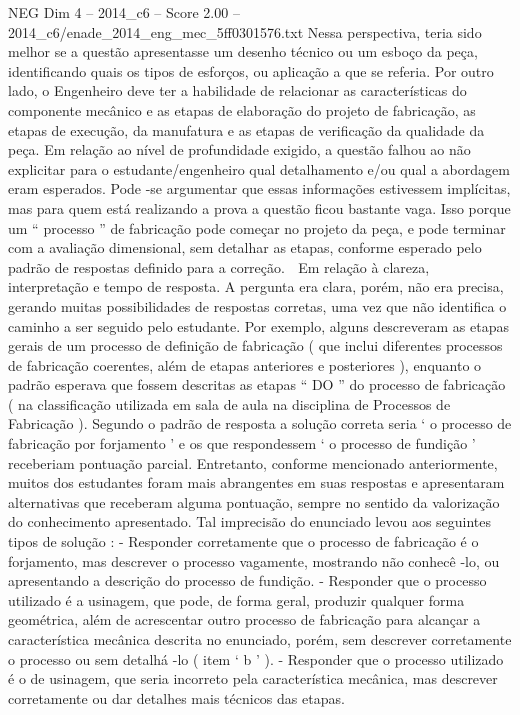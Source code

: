 \begin{textsample}{NEG Dim 4 – 2014\_c6 – Score 2.00 – 2014\_c6/enade\_2014\_eng\_mec\_5ff0301576.txt}
Nessa perspectiva, teria sido melhor se a questão apresentasse um desenho técnico ou um esboço da peça, identificando quais os tipos de esforços, ou aplicação a que se referia.
Por outro lado, o Engenheiro deve ter a habilidade de relacionar as características do componente mecânico e as etapas de elaboração do projeto de fabricação, as etapas de execução, da manufatura e as etapas de verificação da qualidade da peça.
Em relação ao nível de profundidade exigido, a questão falhou ao não explicitar para o estudante/engenheiro qual detalhamento e/ou qual a abordagem eram esperados.
Pode -se argumentar que essas informações estivessem implícitas, mas para quem está realizando a prova a questão ficou bastante vaga.
Isso porque um “ processo ” de fabricação pode começar no projeto da peça, e pode terminar com a avaliação dimensional, sem detalhar as etapas, conforme esperado pelo padrão de respostas definido para a correção.  Em relação à clareza, interpretação e tempo de resposta.
A pergunta era clara, porém, não era precisa, gerando muitas possibilidades de respostas corretas, uma vez que não identifica o caminho a ser seguido pelo estudante.
Por exemplo, alguns descreveram as etapas gerais de um processo de definição de fabricação ( que inclui diferentes processos de fabricação coerentes, além de etapas anteriores e posteriores ), enquanto o padrão esperava que fossem descritas as etapas “ DO ” do processo de fabricação ( na classificação utilizada em sala de aula na disciplina de Processos de Fabricação ).
Segundo o padrão de resposta a solução correta seria ‘ o processo de fabricação por forjamento ’ e os que respondessem ‘ o processo de fundição ’ receberiam pontuação parcial.
Entretanto, conforme mencionado anteriormente, muitos dos estudantes foram mais abrangentes em suas respostas e apresentaram alternativas que receberam alguma pontuação, sempre no sentido da valorização do conhecimento apresentado.
Tal imprecisão do enunciado levou aos seguintes tipos de solução : - Responder corretamente que o processo de fabricação é o forjamento, mas descrever o processo vagamente, mostrando não conhecê -lo, ou apresentando a descrição do processo de fundição. - Responder que o processo utilizado é a usinagem, que pode, de forma geral, produzir qualquer forma geométrica, além de acrescentar outro processo de fabricação para alcançar a característica mecânica descrita no enunciado, porém, sem descrever corretamente o processo ou sem detalhá -lo ( item ‘ b ’ ). - Responder que o processo utilizado é o de usinagem, que seria incorreto pela característica mecânica, mas descrever corretamente ou dar detalhes mais técnicos das etapas.

\end{textsample}
